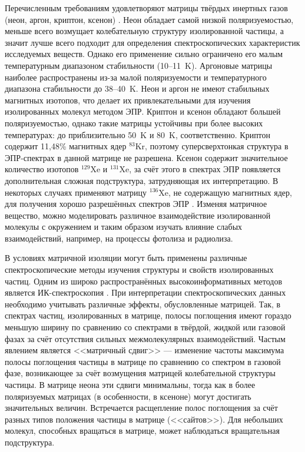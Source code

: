 {Перечисленным требованиям удовлетворяют матрицы твёрдых инертных газов (неон, аргон, криптон, ксенон) \cite{MI}. Неон обладает самой низкой поляризуемостью, меньше всего возмущает колебательную структуру изолированной частицы,
а значит лучше всего подходит для определения спектроскопических характеристик исследуемых веществ. Однако его применение сильно ограничено его малым температурным 
диапазоном стабильности (10--11~K).   Аргоновые матрицы наиболее распространены из-за малой поляризуемости и температурного 
диапазона стабильности до 38--40~K. Неон и аргон не имеют стабильных магнитных изотопов, что делает их привлекательными для изучения изолированных молекул методом ЭПР.
 Криптон и ксенон обладают большей поляризуемостью, однако такие матрицы устойчивы при более высоких температурах: до приблизительно 50~K и 80~K, соответственно.
 Криптон содержит 11,48\% магнитных ядер $^{83}$Kr, поэтому суперсверхтонкая структура в ЭПР-спектрах в данной матрице не разрешена. Ксенон содержит значительное
количество изотопов $^{129}$Xe и $^{131}$Xe, за счёт этого в спектрах ЭПР появляется дополнительная сложная подструктура, затрудняющая их интерпретацию. В некоторых случаях применяют матрицу $^{136}$Xe, не содержащую магнитных ядер, для 
получения хорошо разрешённых спектров ЭПР \cite{Feldman2012_}.
 Изменяя матричное вещество, можно моделировать различное взаимодействие изолированной молекулы с окружением и таким образом изучать влияние слабых взаимодействий, например, на процессы фотолиза и радиолиза.
 
В условиях матричной изоляции могут быть применены различные спектроскопические методы изучения структуры и свойств изолированных частиц. Одним из широко распространённых 
высокоинформативных методов является ИК-спектроскопия \cite{Feldman2014}.
 При интерпретации спектроскопических данных необходимо учитывать различные эффекты, обусловленные матрицей.
Так, в спектрах частиц, изолированных в матрице, полосы поглощения имеют гораздо меньшую ширину по сравнению
со спектрами в твёрдой, жидкой или газовой фазах за счёт отсутствия сильных межмолекулярных взаимодействий. Частым явлением является <<матричный сдвиг>> ---
изменение частоты максимума полосы поглощения частицы в матрице по сравнению со спектром в газовой фазе, возникающее за счёт возмущения матрицей колебательной структуры
частицы. В матрице неона эти сдвиги минимальны, тогда как в более поляризуемых матрицах (в особенности, в ксеноне) могут достигать значительных величин.
Встречается расщепление полос поглощения за счёт разных типов положения частицы в матрице (<<сайтов>>).  Для небольших молекул, способных вращаться в матрице, может 
наблюдаться вращательная подструктура. 

}
